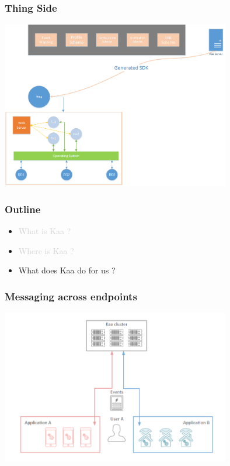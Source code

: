 \documentclass{beamer}
\begin{document}
\begin{frame}
	\frametitle{Thing Side}
	\centering\includegraphics[width=10cm]{diags/kaa-arch-2.png}
\end{frame}

\begin{frame}
	\frametitle{Outline}
	\begin{itemize}
		\item \textcolor{LightGray}{What is Kaa ?}
		\item \textcolor{LightGray}{Where is Kaa ?}
		\item What does Kaa do for us ?
	\end{itemize}
\end{frame}

\begin{frame}
	\frametitle{Messaging across endpoints}
	\centering\includegraphics[width=10cm]{figs/messaging.png}
\end{frame}
\end{document}
